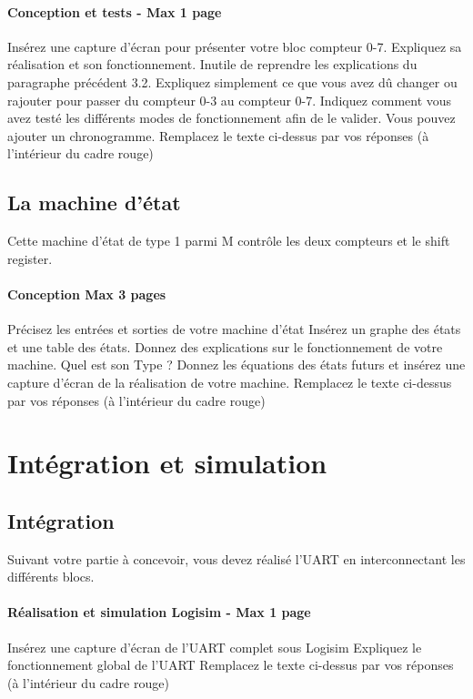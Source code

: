 \documentclass[a4paper]{article} %
\begin{document}
\begin{tcolorbox}[colframe=Monokaimagenta,colback=white]
\paragraph{Conception et tests - Max 1 page}
Insérez une capture d’écran pour présenter votre bloc compteur 0-7. Expliquez sa réalisation et son fonctionnement. Inutile de reprendre les explications du paragraphe précédent 3.2. Expliquez simplement ce que vous avez dû changer ou rajouter pour passer du compteur 0-3 au compteur 0-7.
Indiquez comment vous avez testé les différents modes de fonctionnement afin de le valider. Vous pouvez ajouter un chronogramme.
Remplacez le texte ci-dessus par vos réponses (à l’intérieur du cadre rouge)\\


\end{tcolorbox}
\subsection{La machine d’état}
Cette machine d’état de type 1 parmi M contrôle les deux compteurs et le shift register. 
\begin{tcolorbox}[colframe=Monokaimagenta,colback=white]
\paragraph{Conception Max 3 pages}
Précisez les entrées et sorties de votre machine d’état
Insérez un graphe des états et une table des états. Donnez des explications sur le fonctionnement de votre machine. Quel est son Type ?
Donnez les équations des états futurs et insérez une capture d’écran de la réalisation de votre machine.
Remplacez le texte ci-dessus par vos réponses (à l’intérieur du cadre rouge)
\\
\end{tcolorbox}
\section {Intégration et simulation}
\subsection{Intégration}
Suivant votre partie à concevoir, vous devez réalisé l’UART en interconnectant les différents blocs. 
\begin{tcolorbox}[colframe=Monokaimagenta,colback=white]
\paragraph{Réalisation et simulation Logisim - Max 1 page}
Insérez une capture d’écran de l’UART complet sous Logisim
Expliquez le fonctionnement global de l’UART
Remplacez le texte ci-dessus par vos réponses (à l’intérieur du cadre rouge)
\\
\end{tcolorbox}
\end{document}
